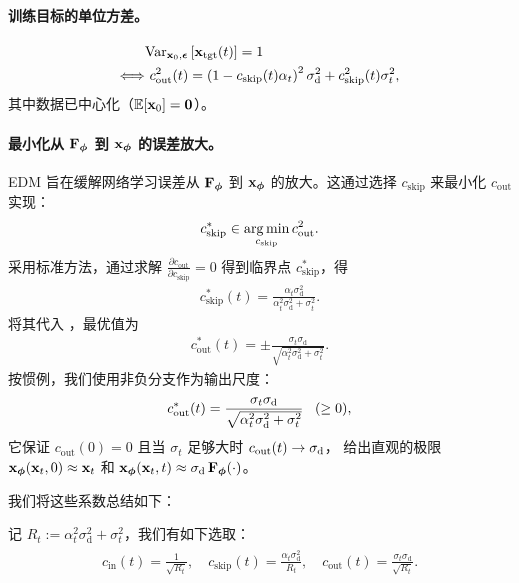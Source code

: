 \paragraph{训练目标的单位方差。}
\begin{align}\label{eq:c-out}
    &\text{Var}_{{\mathbf{x}}_0,\bm{\epsilon}}\left[ {\mathbf{x}}_{\mathrm{tgt}}(t) \right] = 1 \nonumber
    \\ \Longleftrightarrow &~c_{\mathrm{out}}^2(t)  = \left(1-c_{\mathrm{skip}}(t)\alpha_t\right)^2 \sigma_{\mathrm{d}}^2 + c_{\mathrm{skip}}^2(t)\sigma_t^2,
\end{align}
其中数据已中心化（$\mathbb{E}[{\mathbf{x}}_0]=\bm{0}$）。
\paragraph{最小化从 ${\mathbf{F}}_{\bm{\phi}}$ 到 ${\mathbf{x}}_{\bm{\phi}}$ 的误差放大。} EDM 旨在缓解网络学习误差从 ${\mathbf{F}}_{\bm{\phi}}$ 到 ${\mathbf{x}}_{\bm{\phi}}$ 的放大。这通过选择 $c_{\mathrm{skip}}$ 来最小化 $c_{\mathrm{out}}$ 实现：
\[
c_{\mathrm{skip}}^* \in \operatorname*{arg\,min}_{c_{\mathrm{skip}}}  c_{\mathrm{out}}^2.
\]
采用标准方法，通过求解 $\frac{\partial c_{\mathrm{out}}}{\partial c_{\mathrm{skip}}} = 0$ 得到临界点 $c_{\mathrm{skip}}^*$，得
\begin{align*}
    c_{\mathrm{skip}}^*(t) = \frac{\alpha_t \sigma_{\mathrm{d}}^2 }{\alpha_t^2 \sigma_{\mathrm{d}}^2  + \sigma_t^2}. 
\end{align*}
将其代入 ，最优值为
\begin{align*}
    c_{\mathrm{out}}^*(t) = \pm \frac{\sigma_t \sigma_{\mathrm{d}} }{\sqrt{\alpha_t^2 \sigma_{\mathrm{d}}^2  + \sigma_t^2}}. 
\end{align*}
按惯例，我们使用非负分支作为输出尺度：
\[
c_{\mathrm{out}}^*(t) = \frac{\sigma_t \sigma_{\text d}}
{\sqrt{\alpha_t^2 \sigma_{\text d}^2 + \sigma_t^2}}
\;\;\;(\ge 0),
\]
它保证 $c_{\mathrm{out}}(0)=0$ 且当 $\sigma_t$ 足够大时 $c_{\mathrm{out}}(t)\to\sigma_{\text d}$，
给出直观的极限 ${\mathbf{x}}_{\bm{\phi}}({\mathbf{x}}_t,0)\approx {\mathbf{x}}_t$ 和
${\mathbf{x}}_{\bm{\phi}}({\mathbf{x}}_t,t)\approx \sigma_{\text d}\,{\mathbf{F}}_{\bm{\phi}}(\cdot)$。



我们将这些系数总结如下：
\begin{mdframed}
记 $R_t := \alpha_t^2 \sigma_{\mathrm{d}}^2+ \sigma_t^2$，我们有如下选取：
    \begin{align}\label{eq:edm-coeff}
        \begin{aligned}
            c_{\mathrm{in}}(t)  = \frac{1}{\sqrt{R_t}}, \quad
            c_{\mathrm{skip}}(t) = \frac{\alpha_t \sigma_{\mathrm{d}}^2 }{R_t}, \quad
            c_{\mathrm{out}}(t) =  \frac{\sigma_t \sigma_{\mathrm{d}} }{\sqrt{R_t}}.
        \end{aligned}
    \end{align}
\end{mdframed}

